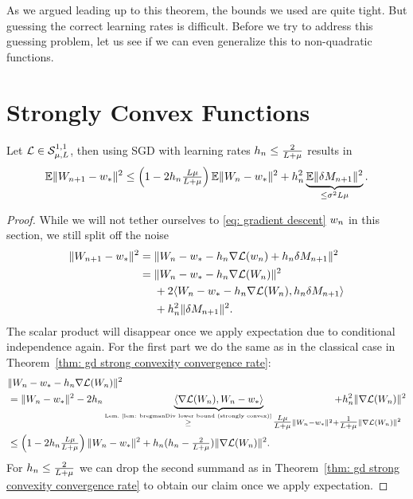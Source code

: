 As we argued leading up to this theorem, the bounds
we used are quite tight. But guessing the correct learning rates is difficult.
Before we try to address this guessing problem, let us see if we can even
generalize this to non-quadratic functions.


\section{Strongly Convex Functions}

\begin{lemma}\label{lem: SGD bound with noise}
	Let \(\mathcal{L}\in\mathcal{S}^{1,1}_{{\mu},{L}}\), then using SGD with learning
	rates \(h_n\le\tfrac2{L+\mu}\) results in
	\begin{align}\label{eq: SGD bound with noise}
		\mathbb{E}\|W_{n+1} - w_*\|^2
		\le \left(1-2h_n\tfrac{L\mu}{L+\mu}\right)
		\mathbb{E}\|W_n - w_*\|^2 + h_n^2 \underbrace{\mathbb{E}\|\delta M_{n+1}\|^2}_{\le\sigma^2L\mu}.
	\end{align}
\end{lemma}
\begin{proof}
	While we will not tether ourselves to \ref{eq: gradient descent} \(w_n\) in
	this section, we still split off the noise
	\begin{align*}
		\|W_{n+1} - w_*\|^2
		&= \|W_n -w_* - h_n\nabla\mathcal{L}(w_n) +h_n \delta M_{n+1}\|^2\\
		&= \begin{aligned}[t]
			&\|W_n - w_* - h_n\nabla\mathcal{L}(W_n)\|^2\\
			&+ 2\langle W_n - w_* - h_n\nabla\mathcal{L}(W_n), h_n \delta M_{n+1}\rangle\\
			&+ h_n^2 \|\delta M_{n+1}\|^2.
		\end{aligned}
	\end{align*}
	The scalar product will disappear once we apply expectation due to conditional
	independence again. For the first part we do the same as in the
	classical case in Theorem~\ref{thm: gd strong convexity convergence rate}:
	\begin{align}
		\nonumber
		&\|\Weights_n - \minimum - \lr_n\nabla\Loss(\Weights_n)\|^2\\
		\label{eq: getting rid of the scalar product (SGD)}
		&= \|\Weights_n - \minimum\|^2
		- 2\lr_n\underbrace{\langle\nabla\Loss(\Weights_n), \Weights_n-\minimum\rangle}_{
			\xge{\text{Lem.~\ref{lem: bregmanDiv lower bound (strongly convex)}}}
			\tfrac{\ubound\lbound}{\ubound+\lbound}\|\Weights_n - \minimum\|^2
			\mathrlap{+ \tfrac{1}{\ubound+\lbound}\|\nabla\Loss(\Weights_n)\|^2}
		}
		+ \lr_n^2 \|\nabla\Loss(\Weights_n)\|^2\\
		\nonumber
		&\le \left(1-2\lr_n\tfrac{\ubound\lbound}{\ubound+\lbound}\right)
		\|\Weights_n - \minimum\|^2
		+ \lr_n(\lr_n - \tfrac{2}{\ubound+\lbound})
		\|\nabla\Loss(\Weights_n)\|^2.
	\end{align}
	For \(h_n\le\tfrac{2}{L+\mu}\) we can drop the second summand
	as in Theorem~\ref{thm: gd strong convexity convergence rate} to obtain our
	claim once we apply expectation.
\end{proof}

